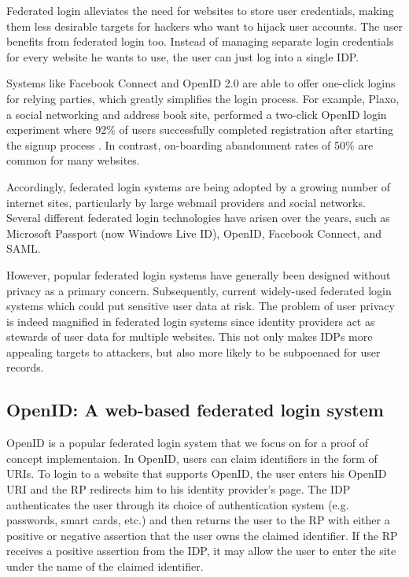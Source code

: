 \documentclass{llncs}
\begin{document}
Federated login alleviates the need for websites to store user
credentials, making them less desirable targets for hackers who want
to hijack user accounts. The user benefits from federated login too.
Instead of managing separate login credentials for every website he
wants to use, the user can just log into a single IDP.

Systems like Facebook Connect and OpenID 2.0 are able to offer
one-click logins for relying parties, which greatly simplifies the
login process. For example, Plaxo, a social networking and address
book site, performed a two-click OpenID login experiment where 92\% of
users successfully completed registration after starting the signup
process \cite{Ki09}. In contrast, on-boarding abandonment rates of
50\% are common for many websites.

Accordingly, federated login systems are being adopted by a growing
number of internet sites, particularly by large webmail providers and
social networks.  Several different federated login technologies have
arisen over the years, such as Microsoft Passport (now Windows Live
ID), OpenID, Facebook Connect, and SAML.

However, popular federated login systems have generally been designed
without privacy as a primary concern. Subsequently, current
widely-used federated login systems which could put sensitive user
data at risk. The problem of user privacy is indeed magnified in
federated login systems since identity providers act as stewards of
user data for multiple websites. This not only makes IDPs more
appealing targets to attackers, but also more likely to be subpoenaed
for user records.

\subsection{OpenID: A web-based federated login system}

OpenID is a popular federated login system that we focus on for a
proof of concept implementaion. In OpenID, users can claim
identifiers in the form of URIs. To login to a website that supports
OpenID, the user enters his OpenID URI and the RP redirects him to
his identity provider's page. The IDP authenticates the user through
its choice of authentication system (e.g. passwords, smart cards,
etc.) and then returns the user to the RP with either a positive or
negative assertion that the user owns the claimed identifier. If the
RP receives a positive assertion from the IDP, it may allow the user
to enter the site under the name of the claimed identifier.
\end{document}
